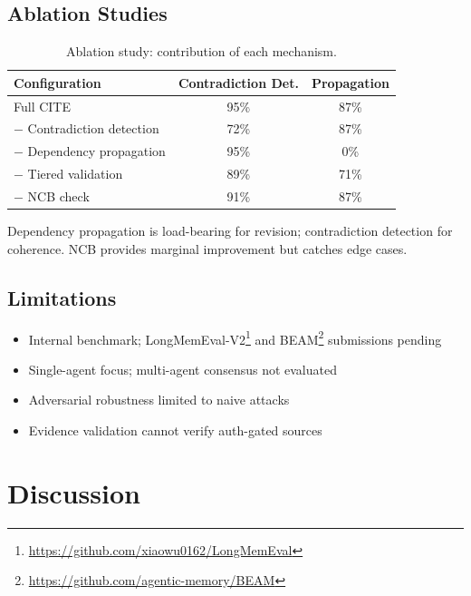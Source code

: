 \documentclass[11pt,letterpaper]{article}
\begin{document}
\subsection{Ablation Studies}

\begin{table}[H]
\centering
\caption{Ablation study: contribution of each mechanism.}
\label{tab:ablation}
\begin{tabular}{@{}lcc@{}}
\toprule
\textbf{Configuration} & \textbf{Contradiction Det.} & \textbf{Propagation} \\
\midrule
Full CITE & 95\% & 87\% \\
$-$ Contradiction detection & 72\% & 87\% \\
$-$ Dependency propagation & 95\% & 0\% \\
$-$ Tiered validation & 89\% & 71\% \\
$-$ NCB check & 91\% & 87\% \\
\bottomrule
\end{tabular}
\end{table}

Dependency propagation is load-bearing for revision; contradiction detection for coherence. NCB provides marginal improvement but catches edge cases.

\subsection{Limitations}

\begin{itemize}[noitemsep]
    \item Internal benchmark; LongMemEval-V2\footnote{\url{https://github.com/xiaowu0162/LongMemEval}} and BEAM\footnote{\url{https://github.com/agentic-memory/BEAM}} submissions pending
    \item Single-agent focus; multi-agent consensus not evaluated
    \item Adversarial robustness limited to naive attacks
    \item Evidence validation cannot verify auth-gated sources
\end{itemize}

\section{Discussion}
\label{sec:discussion}
\end{document}
